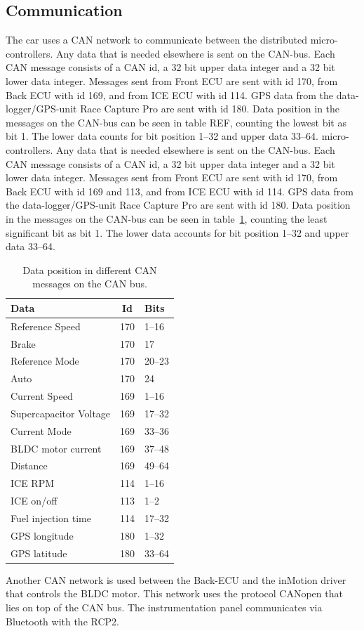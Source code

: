 \subsection{Communication}
The car uses a CAN network to communicate between the distributed
micro-controllers. Any data that is needed elsewhere is sent on the CAN-bus.
Each CAN message consists of a CAN id, a 32 bit upper data integer and a 32 bit
lower data integer. Messages sent from Front ECU are sent with id 170, from
Back ECU with id 169, and from ICE ECU with id 114. GPS data from the
data-logger/GPS-unit Race Capture Pro are sent with id 180. Data position in
the messages on the CAN-bus can be seen in table REF, counting the lowest bit
as bit 1. The lower data counts for bit position 1--32 and upper data 33--64.
micro-controllers. Any data that is needed elsewhere is sent on the CAN-bus.
Each CAN message consists of a CAN id, a 32 bit upper data integer and a 32 bit
lower data integer. Messages sent from Front ECU are sent with id 170, from Back
ECU with id 169 and 113, and from ICE ECU with id 114. GPS data from the
data-logger/GPS-unit Race Capture Pro are sent with id 180. Data position in the
messages on the CAN-bus can be seen in table~\ref{table:CAN}, counting the
least significant bit as bit 1. The lower data accounts for bit
position 1--32 and upper data 33--64.
\begin{table}[H]
\label{table:CAN}
\begin{center}
\begin{tabular}{lcl}
\textbf{Data} & \textbf{Id} & \textbf{Bits}\\
\toprule
Reference Speed & 170 & 1--16 \\
Brake & 170 & 17 \\
Reference Mode & 170 & 20--23 \\
Auto & 170 & 24 \\
Current Speed & 169 & 1--16 \\
Supercapacitor Voltage & 169 & 17--32 \\ 
Current Mode & 169 & 33--36 \\ 
BLDC motor current & 169 & 37--48 \\
Distance & 169 & 49--64 \\
ICE RPM & 114 & 1--16 \\
ICE on/off & 113 & 1--2 \\
Fuel injection time & 114 & 17--32 \\
GPS longitude & 180 & 1--32 \\ 
GPS latitude & 180 & 33--64 \\
\bottomrule
\end{tabular}
\end{center}
\caption{Data position in different CAN messages on the CAN bus.}
\end{table}
Another CAN network is used between the Back-ECU and the inMotion driver that
controls the BLDC motor. This network uses the protocol CANopen that
lies on top of the CAN bus. The instrumentation panel communicates via Bluetooth
with the RCP2.

